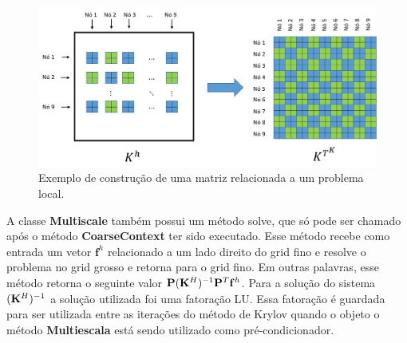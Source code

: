 \begin{figure}[!htbp]
\centering
\includegraphics[width=\textwidth]{chap07/figs/submatrix.png}
\caption{Exemplo de construção de uma matriz relacionada a um problema local.}
\label{fig:submatrix}
\end{figure}


A classe \textbf{Multiscale} também possui um método solve, que só pode ser chamado após o método \textbf{CoarseContext} ter sido executado. Esse método recebe como entrada um vetor $\mathbf{f}^h$ relacionado a um lado direito do grid fino e resolve o problema no grid grosso e retorna para o grid fino. Em outras palavras, esse método retorna o seguinte valor $\mathbf{P}(\mathbf{K}^H)^{-1}\mathbf{P}^T \mathbf{f}^h$. Para a solução do sistema $(\mathbf{K}^H)^{-1}$ a solução utilizada foi uma fatoração LU. Essa fatoração é guardada para ser utilizada entre as iterações do método de Krylov quando o objeto o método \textbf{Multiescala} está sendo utilizado como pré-condicionador.

                                                                                   